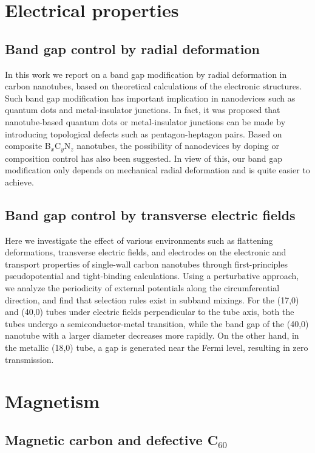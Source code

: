 \documentclass[doctor,english,final]{kaist-ucs}
\begin{document}
\chapter{Electrical properties}

\section{Band gap control by radial deformation}

In this work we report on a band gap modification by radial deformation
in carbon nanotubes, based on theoretical calculations of the electronic
structures.
Such band gap modification has important implication in nanodevices
such as quantum dots and metal-insulator junctions.
In fact, it was proposed that nanotube-based quantum dots or
metal-insulator junctions can be made by introducing topological
defects such as pentagon-heptagon pairs.
Based on composite B$_{x}$C$_{y}$N$_{z}$ nanotubes, the possibility of
nanodevices by doping or composition control has also been
suggested.
In view of this, our band gap modification only depends on mechanical
radial deformation and is quite easier to achieve.


\section{Band gap control by transverse electric fields}

Here we investigate the effect of various environments such as
flattening deformations, transverse electric fields, and electrodes on the
electronic and transport properties of single-wall carbon nanotubes through
first-principles pseudopotential and tight-binding calculations.
Using a perturbative approach, we analyze the periodicity of external
potentials along the circumferential direction, and find that selection
rules exist in subband mixings.
For the (17,0) and (40,0) tubes under electric fields perpendicular to the
tube axis, both the tubes undergo a semiconductor-metal transition, while
the band gap of the (40,0) nanotube with a larger diameter decreases more
rapidly.
On the other hand, in the metallic (18,0) tube, a gap is generated near
the Fermi level, resulting in zero transmission.


\chapter{Magnetism}

\section{Magnetic carbon and defective C$_{60}$}
\end{document}
